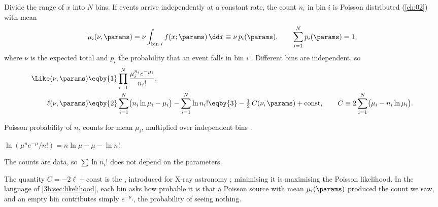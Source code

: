 Divide the range of $x$ into $N$ bins. If events arrive independently at a
constant rate, the count $n_i$ in bin $i$ is Poisson distributed
(\cref{ch:02}) with mean
\[
  \mu_i(\nu,\params)=\nu\int_{\text{bin }i}f(x;\params)\,\dd x\equiv\nu\,p_i(\params),
  \qquad\sum_{i=1}^Np_i(\params)=1,
\]
where $\nu$ is the expected total and $p_i$ the probability that an event
falls in bin $i$ . Different bins are independent,
so
\begin{align}
  \Like(\nu,\params)
  &\eqby{1}\prod_{i=1}^N\frac{\mu_i^{n_i}e^{-\mu_i}}{n_i!},
  \nonumber\\
  \ell(\nu,\params)
  &\eqby{2}\sum_{i=1}^N\bigl(n_i\ln\mu_i-\mu_i\bigr)-\sum_{i=1}^N\ln n_i!
  \eqby{3}-\tfrac12\,C(\nu,\params)+\text{const},
  \qquad
  C\equiv2\sum_{i=1}^N\bigl(\mu_i-n_i\ln\mu_i\bigr).
  \label{3b:eq:poisson-like}
\end{align}
\begin{explain}
  \item Poisson probability of $n_i$ counts for mean $\mu_i$, multiplied over
        independent bins .
  \item $\ln(\mu^ne^{-\mu}/n!)=n\ln\mu-\mu-\ln n!$.
  \item The counts are data, so $\sum\ln n_i!$ does not depend on the
        parameters.
\end{explain}
The quantity $C=-2\ell+\text{const}$ is the ,
introduced for X-ray astronomy \cite{Cash1979}; minimising it is
maximising the Poisson likelihood. In the language of
\cref{3b:sec:likelihood}, each bin asks how probable it is that a Poisson
source with mean $\mu_i(\params)$ produced the count we saw, and an empty
bin contributes simply $e^{-\mu_i}$, the probability of seeing nothing.

